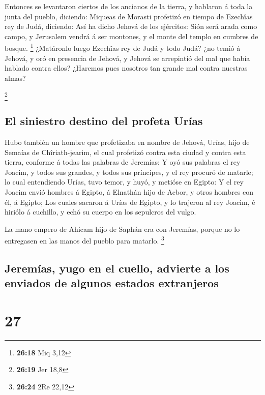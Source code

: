  Entonces se levantaron ciertos de los ancianos de la
tierra, y hablaron á toda la junta del pueblo, diciendo: 
Miqueas de Morasti profetizó en tiempo de Ezechîas rey de Judá,
diciendo: Así ha dicho Jehová de los ejércitos: Sión será arada como
campo, y Jerusalem vendrá á ser montones, y el monte del templo en
cumbres de bosque. \footnote{\textbf{26:18} Miq 3,12} 
¿Matáronlo luego Ezechîas rey de Judá y todo Judá? ¿no temió á Jehová, y
oró en presencia de Jehová, y Jehová se arrepintió del mal que había
hablado contra ellos? ¿Haremos pues nosotros tan grande mal contra
nuestras almas?

\footnote{\textbf{26:19} Jer 18,8}

\hypertarget{el-siniestro-destino-del-profeta-uruxedas}{%
\subsection{El siniestro destino del profeta
Urías}\label{el-siniestro-destino-del-profeta-uruxedas}}

 Hubo también un hombre que profetizaba en nombre de
Jehová, Urías, hijo de Semaías de Chîriath-jearim, el cual profetizó
contra esta ciudad y contra esta tierra, conforme á todas las palabras
de Jeremías:  Y oyó sus palabras el rey Joacim, y todos
sus grandes, y todos sus príncipes, y el rey procuró de matarle; lo cual
entendiendo Urías, tuvo temor, y huyó, y metióse en Egipto:
 Y el rey Joacim envió hombres á Egipto, á Elnathán hijo
de Acbor, y otros hombres con él, á Egipto;  Los cuales
sacaron á Urías de Egipto, y lo trajeron al rey Joacim, é hiriólo á
cuchillo, y echó su cuerpo en los sepulcros del vulgo.

 La mano empero de Ahicam hijo de Saphán era con
Jeremías, porque no lo entregasen en las manos del pueblo para matarlo.
\footnote{\textbf{26:24} 2Re 22,12}

\hypertarget{jeremuxedas-yugo-en-el-cuello-advierte-a-los-enviados-de-algunos-estados-extranjeros}{%
\subsection{Jeremías, yugo en el cuello, advierte a los enviados de
algunos estados
extranjeros}\label{jeremuxedas-yugo-en-el-cuello-advierte-a-los-enviados-de-algunos-estados-extranjeros}}

\hypertarget{section-26}{%
\section{27}\label{section-26}}

